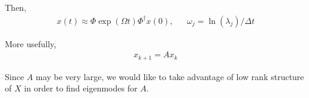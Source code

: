 \documentclass[12pt]{article}
\begin{document}
Then,
\begin{align*}
    x(t) \approx \Phi\exp(\Omega t)\Phi^\dagger x(0), && \omega_j = \ln(\lambda_j)/\Delta t
\end{align*}

More usefully,
\begin{align*}
    x_{k+1} = A x_k
\end{align*}


Since \( A \) may be very large, we would like to take advantage of low rank structure of \( X \) in order to find eigenmodes for \( A \).

\iffalse
\subsubsection{Finding Eigenvalues of a Large Matrix using a Smaller One}
Consider the unitariy similarity transform,
\begin{align*}
    U^*AU, && U = \left[\begin{array}{c|c} \\ \hat{U} & \tilde{U} \\ &  \end{array}\right]
\end{align*}

Expanding we find,
\begin{align*}
    U^*AU = \left[\begin{array}{cc} \hat{U}^*A\hat{U} & \hat{U}^*A \tilde{U} \\ \tilde{U}^*A\hat{U} & \tilde{U}^*A\tilde{U} \end{array}\right]
\end{align*}

Suppose \( w \) is an eigenvalue of \( \hat{U}^*A\hat{U} \) with eigenvalue \( \lambda \). Then,
\begin{align*}
    U^*AU \left[\begin{array}{c} w \\ 0\end{array}\right] = \left[\begin{array}{c} \hat{U}^*A\hat{U} w \\ \tilde{U}^*A\hat{U} w\end{array}\right]
\end{align*}

If \( A = \hat{U} C \) or \( C \tilde{U}^* \) for any \( C \), then \( [w ; 0] \) is an eigenvector of \( U^*AU \) with eigenvalue \( \lambda \).

Therefore \( U[w;0] = \hat{U}w \) is an eigenvalue of \( A \) with eigenvalue \( \lambda \).
\fi
\end{document}
